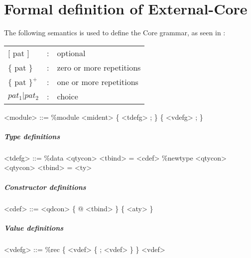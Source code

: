 
\chapter{Formal definition of External-Core}
\label{coregrammar}


The following semantics is used to define the Core grammar, 
as seen in \cite{tolmach2010ghc}:

\begin{scriptsize}

\begin{longtable}{ l c l }

$[$ pat $]$		& :	& optional			\\
$\{$ pat $\}$		& :	& zero or more repetitions	\\
$\{$ pat $\}^{+}$	& :	& one or more repetitions	\\
$pat_{1}|pat_{2}$	& :	& choice			\\

\end{longtable}




\begin{grammar}
<module> ::= \%module <mident> \{ <tdefg> ; \} \{ <vdefg> ; \}
\end{grammar}

\paragraph{Type definitions}

\begin{grammar}
<tdefg> ::= \%data <qtycon> <tbind> = <cdef>
       \alt \%newtype <qtycon> <qtycon> <tbind> = <ty>
\end{grammar}

\paragraph{Constructor definitions}

\begin{grammar}
<cdef> ::= <qdcon> \{ @ <tbind> \} \{ <aty> \}
\end{grammar}

\paragraph{Value definitions}

\begin{grammar}
<vdefg> ::= \%rec \{ <vdef> \{ ; <vdef> \} \}
       \alt <vdef>
\end{grammar}


\end{scriptsize}
